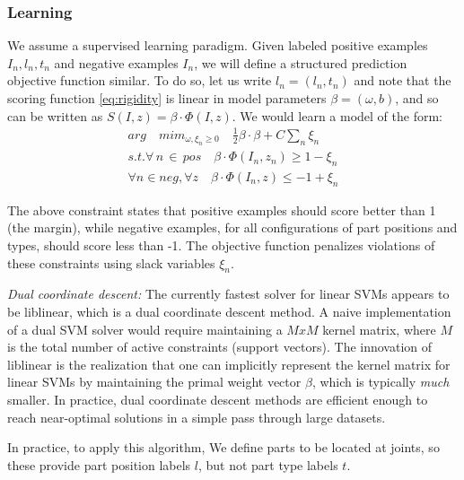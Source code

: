  \subsubsection{Learning}
 We assume a supervised learning paradigm. Given labeled positive examples ${I_n, l_n,t_n}$ 
and negative examples ${I_n}$, we will define a structured prediction objective 
function similar. To do so, let us write $l_n = (l_n, t_n)$ and note that the scoring
function \ref{eq:rigidity} is linear in model parameters $\beta=(\omega,b)$, and so
can be written as $S(I,z)=\beta \cdot \Phi(I,z)$. We would learn a model of the form:
\begin{equation}
\label{eq:learning}
\begin{split}
arg \quad mim_{\omega , \xi_n \geq 0} \quad \frac{1}{2}\beta \cdot \beta + C\sum_n \xi_n \\
s.t. \forall\,n\,\in\,pos \quad \beta \cdot \Phi(I_n, z_n) \geq 1 - \xi_n \\
\forall n \in neg, \forall z \quad \beta \cdot \Phi(I_n,z) \leq -1 + \xi_n
\end{split}
\end{equation}

The above constraint states that positive examples should score better than 1 (the margin),
while negative examples, for all configurations of part positions and types, should
score less than -1. The objective function penalizes violations of these constraints
using slack variables $\xi_n$.

\textit{Dual coordinate descent: } The currently fastest solver for linear SVMs appears to be
liblinear, which is a dual coordinate descent method. A naive implementation of a dual SVM solver would 
require maintaining a $MxM$ kernel matrix, where $M$ is the total number of active constraints
(support vectors). The innovation of liblinear is the realization that one can implicitly
represent the kernel matrix for linear SVMs by maintaining the primal weight vector $\beta$,
which is typically \textit{much} smaller. In practice, dual coordinate descent methods are efficient
enough to reach near-optimal solutions in a simple pass through large datasets.

In practice, to apply this algorithm, We define parts to be located at joints, so these provide
part position labels $l$, but not part type labels $t$.

